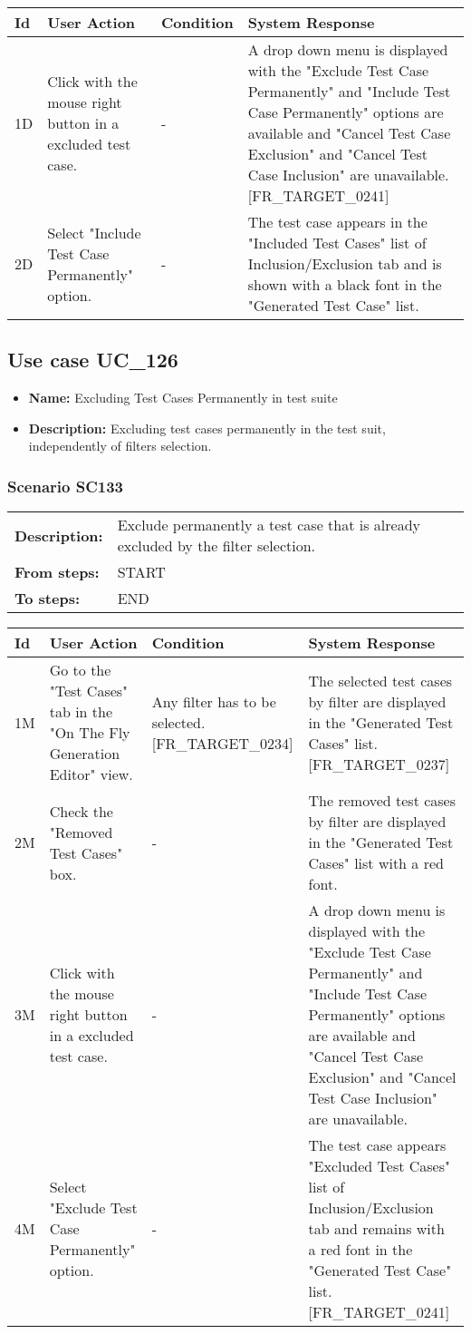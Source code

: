 \documentclass[a4paper,11pt]{article}
\newcommand{\bl}{\\ \hline}
\begin{document}
\begin{tabular}{|p{0.8in}|p{1.6in}|p{1.6in}|p{1.6in}|}
\hline
Id & User Action & Condition & System Response  \bl 
1D & Click with the mouse right button in a excluded test case.
					 & - & A drop down menu is displayed with the "Exclude Test Case
						Permanently" and "Include Test Case Permanently" options are
						available and "Cancel Test Case Exclusion" and "Cancel Test Case
						Inclusion" are unavailable. [FR_TARGET_0241] \bl 
2D & Select "Include Test Case Permanently" option. & - & The test case appears in the "Included Test Cases" list
						of Inclusion/Exclusion tab and is shown with a black font in the
						"Generated Test Case" list. \bl 
\end{tabular}
\subsection*{Use case UC_126}
\begin{itemize}
\item {\bf Name: }Excluding Test Cases Permanently in test suite
\item {\bf Description: }Excluding test cases permanently in the test suit,
				independently of filters selection.
\end{itemize}
\subsubsection*{Scenario SC133}
\begin{tabular}{p{1in}p{4in}}
{\bf Description:} & Exclude permanently a test case that is already
					excluded by the filter selection. \\
{\bf From steps:} & START \\
{\bf To steps:} & END \\
\end{tabular}
 
\begin{tabular}{|p{0.8in}|p{1.6in}|p{1.6in}|p{1.6in}|}
\hline
Id & User Action & Condition & System Response  \bl 
1M & Go to the "Test Cases" tab in the "On The Fly Generation
						Editor" view. & Any filter has to be selected. [FR_TARGET_0234]
					 & The selected test cases by filter are displayed in the
						"Generated Test Cases" list. [FR_TARGET_0237] \bl 
2M & Check the "Removed Test Cases" box. & - & The removed test cases by filter are displayed in the
						"Generated Test Cases" list with a red font. \bl 
3M & Click with the mouse right button in a excluded test case.
					 & - & A drop down menu is displayed with the "Exclude Test Case
						Permanently" and "Include Test Case Permanently" options are
						available and "Cancel Test Case Exclusion" and "Cancel Test Case
						Inclusion" are unavailable. \bl 
4M & Select "Exclude Test Case Permanently" option. & - & The test case appears "Excluded Test Cases" list of
						Inclusion/Exclusion tab and remains with a red font in the
						"Generated Test Case" list. [FR_TARGET_0241] \bl 
\end{tabular}
\end{document}

